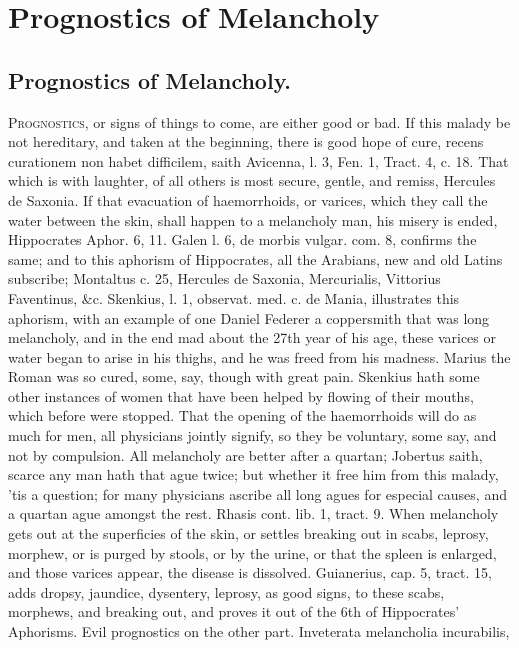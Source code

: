 \chapter{Prognostics of Melancholy}
\section{Prognostics of Melancholy.}

\lettrine{P}{rognostics}, or signs of things to come, are either good or bad. If
this malady be not hereditary, and taken at the beginning, there is
good hope of cure, recens curationem non habet difficilem, saith
Avicenna, l. 3, Fen. 1, Tract. 4, c. 18. That which is with laughter,
of all others is most secure, gentle, and remiss, Hercules de Saxonia.
If that evacuation of haemorrhoids, or varices, which they call
the water between the skin, shall happen to a melancholy man, his
misery is ended, Hippocrates Aphor. 6, 11. Galen l. 6, de morbis
vulgar. com. 8, confirms the same; and to this aphorism of Hippocrates,
all the Arabians, new and old Latins subscribe; Montaltus c. 25,
Hercules de Saxonia, Mercurialis, Vittorius Faventinus, \&c. Skenkius,
l. 1, observat. med. c. de Mania, illustrates this aphorism, with an
example of one Daniel Federer a coppersmith that was long melancholy,
and in the end mad about the 27th year of his age, these varices or
water began to arise in his thighs, and he was freed from his madness.
Marius the Roman was so cured, some, say, though with great pain.
Skenkius hath some other instances of women that have been helped by
flowing of their mouths, which before were stopped. That the opening of
the haemorrhoids will do as much for men, all physicians jointly
signify, so they be voluntary, some say, and not by compulsion. All
melancholy are better after a quartan; Jobertus saith, scarce any
man hath that ague twice; but whether it free him from this malady,
'tis a question; for many physicians ascribe all long agues for
especial causes, and a quartan ague amongst the rest. Rhasis
cont. lib. 1, tract. 9. When melancholy gets out at the superficies of
the skin, or settles breaking out in scabs, leprosy, morphew, or is
purged by stools, or by the urine, or that the spleen is enlarged, and
those varices appear, the disease is dissolved. Guianerius, cap. 5,
tract. 15, adds dropsy, jaundice, dysentery, leprosy, as good signs, to
these scabs, morphews, and breaking out, and proves it out of the 6th
of Hippocrates' Aphorisms.
Evil prognostics on the other part. Inveterata melancholia incurabilis,
